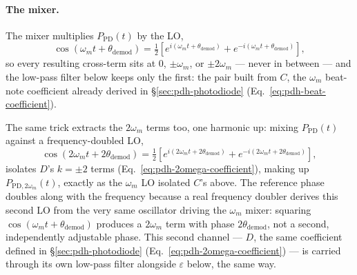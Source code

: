 \documentclass[9pt]{article}
\begin{document}
\paragraph{The mixer.} The mixer multiplies $P_{\mathrm{PD}}(t)$ by the LO,
\[
\cos(\omega_m t+\theta_{\mathrm{demod}})=\tfrac12\left[e^{i(\omega_m t+\theta_{\mathrm{demod}})}+e^{-i(\omega_m t+\theta_{\mathrm{demod}})}\right],
\]
so every resulting cross-term sits at $0$, $\pm\omega_m$, or $\pm2\omega_m$ ---
never in between --- and the low-pass filter below keeps only the first:
the pair built from $C$, the $\omega_m$ beat-note coefficient already
derived in \S\ref{sec:pdh-photodiode} (Eq.~\eqref{eq:pdh-beat-coefficient}).

The same trick extracts the $2\omega_m$ terms too, one harmonic up: mixing
$P_{\mathrm{PD}}(t)$ against a frequency-doubled LO,
\[
\cos(2\omega_m t+2\theta_{\mathrm{demod}}) = \tfrac12\left[e^{i(2\omega_m t+2\theta_{\mathrm{demod}})}+e^{-i(2\omega_m t+2\theta_{\mathrm{demod}})}\right],
\]
isolates $D$'s $k=\pm2$ terms (Eq.~\eqref{eq:pdh-2omega-coefficient}),
making up $P_{\mathrm{PD},2\omega_m}(t)$, exactly as the $\omega_m$ LO
isolated $C$'s above. The reference phase doubles along with the
frequency because a real frequency doubler derives this second LO from
the very same oscillator driving the $\omega_m$ mixer: squaring
$\cos(\omega_m t+\theta_{\mathrm{demod}})$ produces a $2\omega_m$ term with
phase $2\theta_{\mathrm{demod}}$, not a second, independently adjustable
phase. This second channel --- $D$, the same coefficient defined in
\S\ref{sec:pdh-photodiode} (Eq.~\eqref{eq:pdh-2omega-coefficient}) --- is
carried through its own low-pass filter alongside $\varepsilon$ below, the
same way.
\end{document}
